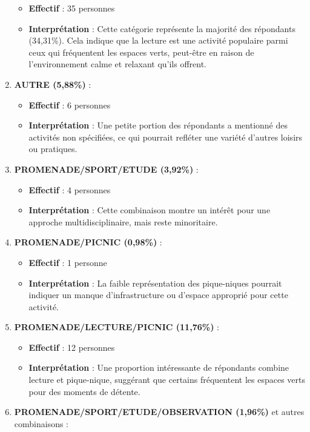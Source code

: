 \documentclass[
]{article}
\providecommand{\tightlist}{%
  \setlength{\itemsep}{0pt}\setlength{\parskip}{0pt}}
\begin{document}
\begin{enumerate}
  \begin{itemize}
  \tightlist
  \item
    \textbf{Effectif} : 35 personnes
  \item
    \textbf{Interprétation} : Cette catégorie représente la majorité des
    répondants (34,31\%). Cela indique que la lecture est une activité
    populaire parmi ceux qui fréquentent les espaces verts, peut-être en
    raison de l'environnement calme et relaxant qu'ils offrent.
  \end{itemize}
\item
  \textbf{AUTRE (5,88\%)} :

  \begin{itemize}
  \tightlist
  \item
    \textbf{Effectif} : 6 personnes
  \item
    \textbf{Interprétation} : Une petite portion des répondants a
    mentionné des activités non spécifiées, ce qui pourrait refléter une
    variété d'autres loisirs ou pratiques.
  \end{itemize}
\item
  \textbf{PROMENADE/SPORT/ETUDE (3,92\%)} :

  \begin{itemize}
  \tightlist
  \item
    \textbf{Effectif} : 4 personnes
  \item
    \textbf{Interprétation} : Cette combinaison montre un intérêt pour
    une approche multidisciplinaire, mais reste minoritaire.
  \end{itemize}
\item
  \textbf{PROMENADE/PICNIC (0,98\%)} :

  \begin{itemize}
  \tightlist
  \item
    \textbf{Effectif} : 1 personne
  \item
    \textbf{Interprétation} : La faible représentation des pique-niques
    pourrait indiquer un manque d'infrastructure ou d'espace approprié
    pour cette activité.
  \end{itemize}
\item
  \textbf{PROMENADE/LECTURE/PICNIC (11,76\%)} :

  \begin{itemize}
  \tightlist
  \item
    \textbf{Effectif} : 12 personnes
  \item
    \textbf{Interprétation} : Une proportion intéressante de répondants
    combine lecture et pique-nique, suggérant que certains fréquentent
    les espaces verts pour des moments de détente.
  \end{itemize}
\item
  \textbf{PROMENADE/SPORT/ETUDE/OBSERVATION (1,96\%)} et autres
  combinaisons :


\end{enumerate}
\end{document}
